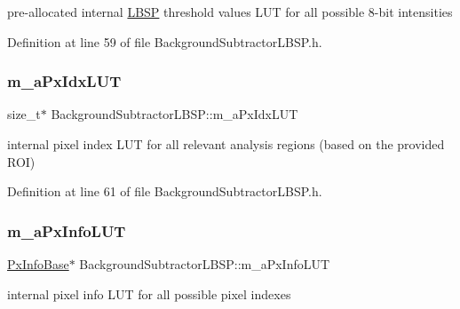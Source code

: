 pre-\/allocated internal \mbox{\hyperlink{class_l_b_s_p}{L\+B\+SP}} threshold values L\+UT for all possible 8-\/bit intensities 



Definition at line 59 of file Background\+Subtractor\+L\+B\+S\+P.\+h.

\mbox{\label{class_background_subtractor_l_b_s_p_a06b4f0d3f24fa08bccd3c9eca085713e}} 
\subsubsection{\texorpdfstring{m\+\_\+a\+Px\+Idx\+L\+UT}{m\_aPxIdxLUT}}
{\footnotesize\ttfamily size\+\_\+t$\ast$ Background\+Subtractor\+L\+B\+S\+P\+::m\+\_\+a\+Px\+Idx\+L\+UT\hspace{0.3cm}{\ttfamily [protected]}}



internal pixel index L\+UT for all relevant analysis regions (based on the provided R\+OI) 



Definition at line 61 of file Background\+Subtractor\+L\+B\+S\+P.\+h.

\mbox{\label{class_background_subtractor_l_b_s_p_a74e73d4832ccdef652d93756582024db}} 
\subsubsection{\texorpdfstring{m\+\_\+a\+Px\+Info\+L\+UT}{m\_aPxInfoLUT}}
{\footnotesize\ttfamily \mbox{\hyperlink{struct_background_subtractor_l_b_s_p_1_1_px_info_base}{Px\+Info\+Base}}$\ast$ Background\+Subtractor\+L\+B\+S\+P\+::m\+\_\+a\+Px\+Info\+L\+UT\hspace{0.3cm}{\ttfamily [protected]}}



internal pixel info L\+UT for all possible pixel indexes 




